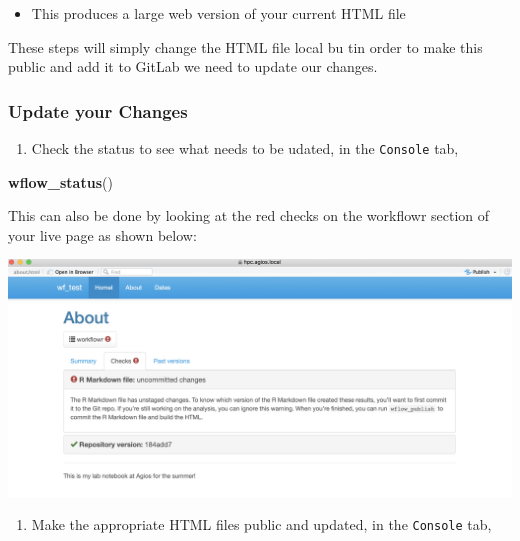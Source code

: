 \documentclass[]{book}
\newenvironment{Shaded}{\begin{snugshade}}{\end{snugshade}}
\newcommand{\KeywordTok}[1]{\textcolor[rgb]{0.13,0.29,0.53}{\textbf{#1}}}
\newcommand{\NormalTok}[1]{#1}
\providecommand{\tightlist}{%
  \setlength{\itemsep}{0pt}\setlength{\parskip}{0pt}}
\begin{document}
\begin{itemize}
\tightlist
\item
  This produces a large web version of your current HTML file
\end{itemize}

These steps will simply change the HTML file local bu tin order to make this public and add it to GitLab we need to update our changes.

\hypertarget{update-your-changes}{%
\subsubsection{Update your Changes}\label{update-your-changes}}

\begin{enumerate}
\def\labelenumi{\arabic{enumi}.}
\tightlist
\item
  Check the status to see what needs to be udated, in the \texttt{Console} tab,
\end{enumerate}

\begin{Shaded}
\begin{Highlighting}[]
\KeywordTok{wflow_status}\NormalTok{()}
\end{Highlighting}
\end{Shaded}

This can also be done by looking at the red checks on the workflowr section of your live page as shown below:

\begin{center}\includegraphics[width=0.9\linewidth]{images/Workflow_Photos/red_checks} \end{center}

\begin{enumerate}
\def\labelenumi{\arabic{enumi}.}
\setcounter{enumi}{1}
\tightlist
\item
  Make the appropriate HTML files public and updated, in the \texttt{Console} tab,
\end{enumerate}
\end{document}
